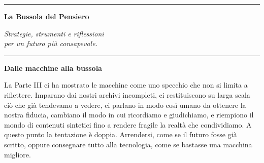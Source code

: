 

\cleardoublepage
\thispagestyle{empty}

\vspace*{\fill}

\begin{center}
    {\sffamily\huge{}}
    
    \vspace{1.5em}
    
    \rule{0.5\textwidth}{0.4pt}
    
    \vspace{1.5em}
    
    {\sffamily\Huge\bfseries La Bussola del Pensiero}
    
    \vspace{2em}
    
    \begin{minipage}{0.7\textwidth}
        \centering
        {\large\itshape\color{moderngray}
        Strategie, strumenti e riflessioni\\
        per un futuro più consapevole.}
    \end{minipage}
    
    \vspace{1.5em}
    
    \rule{0.5\textwidth}{0.4pt}
\end{center}

\vspace*{\fill}

\clearpage
\thispagestyle{empty}
\vspace*{2em}
\begin{center}
	{\sffamily\large\bfseries\color{darkgray} Dalle macchine alla bussola}
\end{center}
\vspace{1em}

La Parte III ci ha mostrato le macchine come uno specchio che non si limita a riflettere. Imparano dai nostri archivi incompleti, ci restituiscono su larga scala ciò che già tendevamo a vedere, ci parlano in modo così umano da ottenere la nostra fiducia, cambiano il modo in cui ricordiamo e giudichiamo, e riempiono il mondo di contenuti sintetici fino a rendere fragile la realtà che condividiamo. A questo punto la tentazione è doppia. Arrendersi, come se il futuro fosse già scritto, oppure consegnare tutto alla tecnologia, come se bastasse una macchina migliore.

